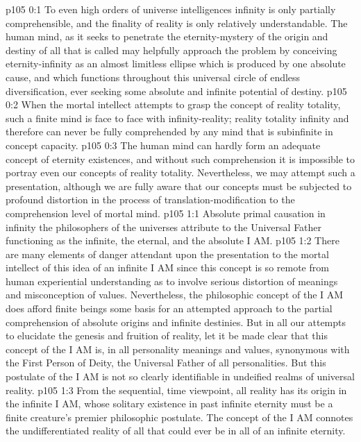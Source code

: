 \author{Melchizedek}
\vs p105 0:1 To even high orders of universe intelligences infinity is only partially comprehensible, and the finality of reality is only relatively understandable. The human mind, as it seeks to penetrate the eternity\hyp{}mystery of the origin and destiny of all that is called  may helpfully approach the problem by conceiving eternity\hyp{}infinity as an almost limitless ellipse which is produced by one absolute cause, and which functions throughout this universal circle of endless diversification, ever seeking some absolute and infinite potential of destiny.
\vs p105 0:2 When the mortal intellect attempts to grasp the concept of reality totality, such a finite mind is face to face with infinity\hyp{}reality; reality totality  infinity and therefore can never be fully comprehended by any mind that is subinfinite in concept capacity.
\vs p105 0:3 The human mind can hardly form an adequate concept of eternity existences, and without such comprehension it is impossible to portray even our concepts of reality totality. Nevertheless, we may attempt such a presentation, although we are fully aware that our concepts must be subjected to profound distortion in the process of translation\hyp{}modification to the comprehension level of mortal mind.
\vs p105 1:1 Absolute primal causation in infinity the philosophers of the universes attribute to the Universal Father functioning as the infinite, the eternal, and the absolute I AM.
\vs p105 1:2 There are many elements of danger attendant upon the presentation to the mortal intellect of this idea of an infinite I AM since this concept is so remote from human experiential understanding as to involve serious distortion of meanings and misconception of values. Nevertheless, the philosophic concept of the I AM does afford finite beings some basis for an attempted approach to the partial comprehension of absolute origins and infinite destinies. But in all our attempts to elucidate the genesis and fruition of reality, let it be made clear that this concept of the I AM is, in all personality meanings and values, synonymous with the First Person of Deity, the Universal Father of all personalities. But this postulate of the I AM is not so clearly identifiable in undeified realms of universal reality.
\vs p105 1:3 \pc {} From the sequential, time viewpoint, all reality has its origin in the infinite I AM, whose solitary existence in past infinite eternity must be a finite creature’s premier philosophic postulate. The concept of the I AM connotes  the undifferentiated reality of all that could ever be in all of an infinite eternity.
